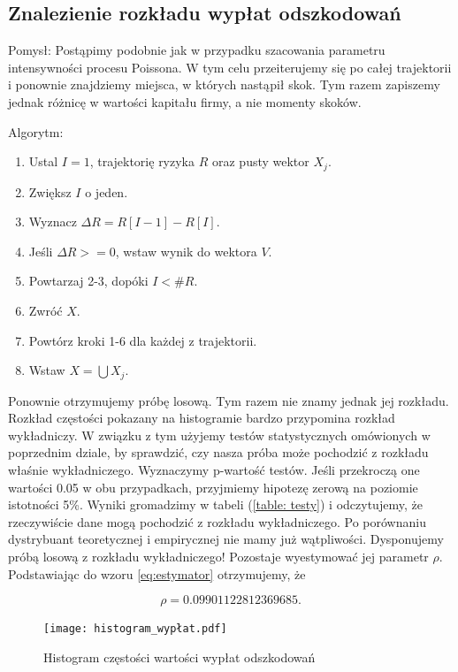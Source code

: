 \documentclass{article}
\theoremstyle{break}
\numberwithin{equation}{subsection}
\numberwithin{figure}{section}
\begin{document}
\subsection{Znalezienie rozkładu wypłat odszkodowań}

Pomysł: Postąpimy podobnie jak w przypadku szacowania parametru intensywności procesu Poissona. W tym celu przeiterujemy się po całej trajektorii i ponownie znajdziemy miejsca, w których nastąpił skok.  Tym razem zapiszemy jednak różnicę w wartości kapitału firmy, a nie momenty skoków.

Algorytm:

\begin{enumerate}
\item Ustal $I = 1$, trajektorię ryzyka $R$ oraz pusty wektor $X_j.$
\item Zwiększ $I$ o jeden.
\item Wyznacz $\Delta R = R[I-1] - R[I]$.
\item Jeśli $\Delta R >= 0$, wstaw wynik do wektora $V$.
\item Powtarzaj 2-3, dopóki $I < \#R$.
\item Zwróć $X.$
\item Powtórz kroki 1-6 dla każdej z trajektorii.
\item Wstaw $X = \bigcup X_j$.
\end{enumerate}

Ponownie otrzymujemy próbę losową. Tym razem nie znamy jednak jej rozkładu. Rozkład częstości pokazany na histogramie bardzo przypomina rozkład wykładniczy. W związku z tym użyjemy testów statystycznych omówionych w poprzednim dziale, by sprawdzić, czy nasza próba może pochodzić z rozkładu właśnie wykładniczego.  Wyznaczymy p-wartość testów. Jeśli przekroczą one wartości 0.05 w obu przypadkach, przyjmiemy hipotezę zerową na poziomie istotności 5\%. Wyniki gromadzimy w tabeli (\ref{table: testy}) i odczytujemy, że rzeczywiście dane mogą pochodzić z rozkładu wykładniczego. Po porównaniu dystrybuant teoretycznej i empirycznej nie mamy już wątpliwości. Dysponujemy próbą losową z rozkładu wykładniczego!
Pozostaje wyestymować jej parametr $\rho$. Podstawiając do wzoru \eqref{eq:estymator} otrzymujemy, że

\begin{equation}
 	\rho = 0.09901122812369685.
\end{equation} 

\begin{figure}[H]
	\center
	\texttt{[image: histogram\_wypłat.pdf]}
	\caption{Histogram częstości wartości wypłat odszkodowań}
	\label{fig: 5}
\end{figure}
\end{document}
